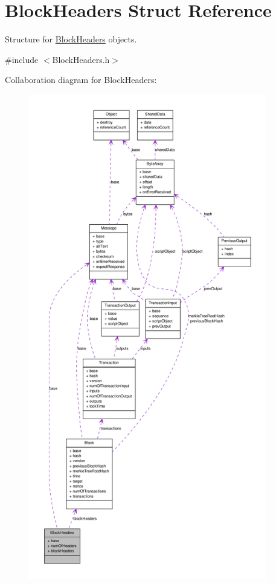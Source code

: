 \hypertarget{struct_block_headers}{
\section{BlockHeaders Struct Reference}
\label{struct_block_headers}
}


Structure for \hyperlink{struct_block_headers}{BlockHeaders} objects.  




{\ttfamily \#include $<$BlockHeaders.h$>$}



Collaboration diagram for BlockHeaders:
\nopagebreak
\begin{figure}[H]
\begin{center}
\leavevmode
\includegraphics[height=600pt]{struct_block_headers__coll__graph}
\end{center}
\end{figure}
